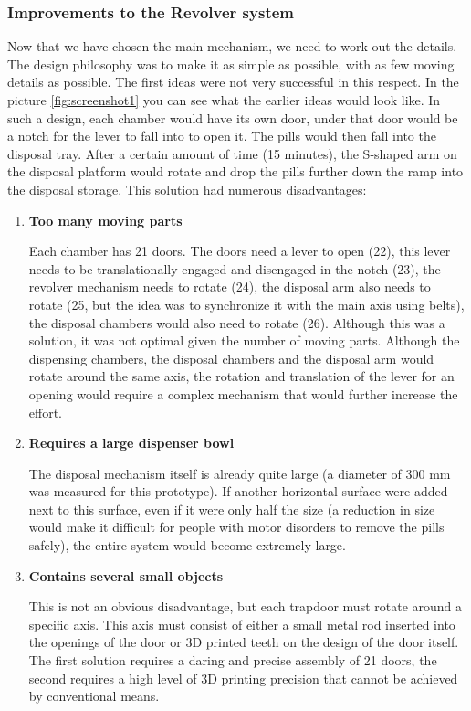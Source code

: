 \subsubsection{Improvements to the Revolver system}
Now that we have chosen the main mechanism, we need to work out the details. The design philosophy was to make it as simple as possible, with as few moving details as possible. The first ideas were not very successful in this respect. In the picture \ref{fig:screenshot1} you can see what the earlier ideas would look like. In such a design, each chamber would have its own door, under that door would be a notch for the lever to fall into to open it. The pills would then fall into the disposal tray. After a certain amount of time (15 minutes), the S-shaped arm on the disposal platform would rotate and drop the pills further down the ramp into the disposal storage. This solution had numerous disadvantages:
\begin{enumerate}
	\item{\textbf{Too many moving parts}}
	
	Each chamber has 21 doors. The doors need a lever to open (22), this lever needs to be translationally engaged and disengaged in the notch (23), the revolver mechanism needs to rotate (24), the disposal arm also needs to rotate (25, but the idea was to synchronize it with the main axis using belts), the disposal chambers would also need to rotate (26). Although this was a solution, it was not optimal given the number of moving parts. Although the dispensing chambers, the disposal chambers and the disposal arm would rotate around the same axis, the rotation and translation of the lever for an opening would require a complex mechanism that would further increase the effort.
	\item{\textbf{Requires a large dispenser bowl}}
	
	The disposal mechanism itself is already quite large (a diameter of 300 mm was measured for this prototype). If another horizontal surface were added next to this surface, even if it were only half the size (a reduction in size would make it difficult for people with motor disorders to remove the pills safely), the entire system would become extremely large.
	\item{\textbf{Contains several small objects}}
	
	This is not an obvious disadvantage, but each trapdoor must rotate around a specific axis. This axis must consist of either a small metal rod inserted into the openings of the door or 3D printed teeth on the design of the door itself. The first solution requires a daring and precise assembly of 21 doors, the second requires a high level of 3D printing precision that cannot be achieved by conventional means.
\end{enumerate}
